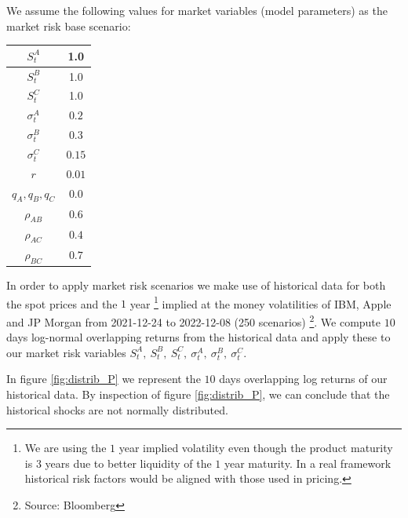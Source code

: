 We assume the following values for market variables (model parameters) as the market risk base scenario:

\begin{center}
\begin{tabular}{||c | c||} 
 \hline
 $S_t^A$ & 1.0 \\
 \hline
 $S_t^B$ & 1.0 \\
 \hline
 $S_t^C$ & 1.0 \\
 \hline
 $\sigma_t^A$ & $0.2$ \\
 \hline
 $\sigma_t^B$ & $0.3$ \\
 \hline
 $\sigma_t^C$ & $0.15$ \\
 \hline
 $r$ & $0.01$ \\
 \hline
 $q_A, q_B, q_C$ & $0.0$ \\
 \hline
 $\rho_{AB}$ & $0.6$ \\
 \hline
 $\rho_{AC}$ & $0.4$ \\
 \hline 
 $\rho_{BC}$ & $0.7$ \\
 \hline
\end{tabular}
\end{center}

In order to apply market risk scenarios we make use of historical data for both the spot prices and the $1$ year \footnote{We are using the $1$ year implied volatility even though the product maturity is $3$ years due to better liquidity of the $1$ year maturity. In a real framework historical risk factors would be aligned with those used in pricing.}   implied at the money volatilities of IBM, Apple and JP Morgan from 2021-12-24 to 2022-12-08 (250 scenarios) \footnote{Source: Bloomberg}. We compute $10$ days log-normal overlapping returns from the historical data and apply these to our market risk variables $S_t^A,\ S_t^B,\ S_t^C,\ \sigma_t^A,\ \sigma_t^B,\ \sigma_t^C$. 

In figure \ref{fig:distrib_P} we represent the $10$ days overlapping log returns of our historical data. By inspection of figure \ref{fig:distrib_P}, we can conclude that the historical shocks are not normally distributed.  

